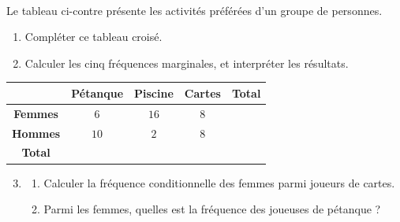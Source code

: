 \documentclass[11pt]{article}
\begin{document}
\pagestyle{empty}

\begin{exo}~\\
\begin{minipage}{.4\textwidth}
  Le tableau ci-contre présente les activités préférées d'un groupe de
  personnes.
  \begin{enumerate}
    \item Compléter ce tableau croisé.
    \item Calculer les cinq fréquences marginales, et interpréter les résultats.
  \end{enumerate}
\end{minipage}
\begin{minipage}{.6\textwidth}
\begin{center}
\renewcommand{\arraystretch}{2}
\begin{tabular}{|c|c|c|c|c|}
  \cline{2-5}
  \multicolumn{1}{c|}{} & \textbf{Pétanque} & \textbf{Piscine} &
  \textbf{Cartes} & \textbf{Total} \\
  \hline
  \textbf{Femmes} & $6$ & $16$ & $8$ & \\
  \hline
  \textbf{Hommes} & $10$ & $2$ & $8$ & \\
  \hline
  \textbf{Total} & & & & \\
  \hline
\end{tabular}
\end{center}
\end{minipage}
\begin{enumerate}
    \setcounter{enumi}{2}
    \item \begin{enumerate}
        \item Calculer la fréquence conditionnelle des femmes parmi joueurs de
          cartes.
        \item Parmi les femmes, quelles est la fréquence des joueuses de
          pétanque ?
  \end{enumerate}
\end{enumerate}
\end{exo}
\end{document}
